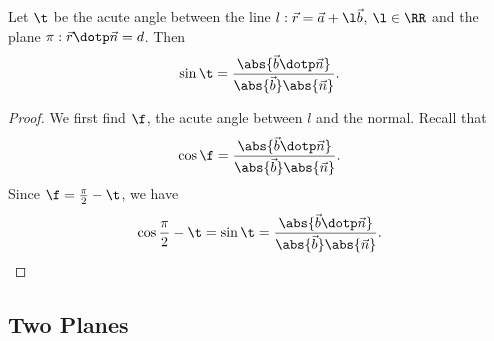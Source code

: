 \begin{proposition}
    Let $\t$ be the acute angle between the line $l : \vec r = \vec a + \l \vec b$, $\l \in \RR$ and the plane $\pi : \vec r \dotp \vec n = d$. Then \[\sin \t = \frac{\abs{\vec b \dotp \vec n}}{\abs{\vec b} \abs{\vec n}}.\]
\end{proposition}
\begin{proof}
    We first find $\f$, the acute angle between $l$ and the normal. Recall that \[\cos \f = \frac{\abs{\vec b \dotp \vec n}}{\abs{\vec b} \abs{\vec n}}.\] Since $\f = \frac\pi2 - \t$, we have \[\cos{\frac\pi2 - \t} = \sin \t = \frac{\abs{\vec b \dotp \vec n}}{\abs{\vec b} \abs{\vec n}}.\]
\end{proof}

\subsection{Two Planes}

